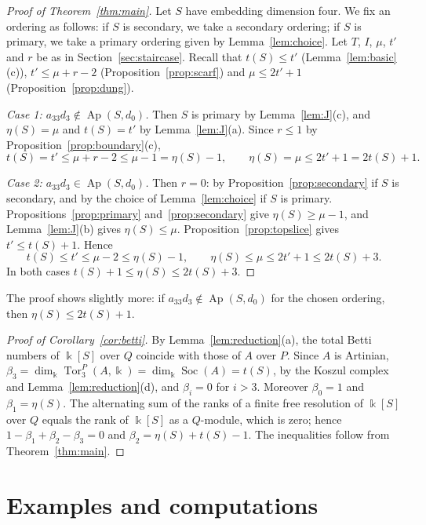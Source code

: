 \documentclass{amsart}
\theoremstyle{definition}
\theoremstyle{remark}
\numberwithin{equation}{section}
\newcommand{\kk}{\Bbbk}
\newcommand{\Ap}{\operatorname{Ap}}
\DeclareMathOperator{\Soc}{Soc}
\DeclareMathOperator{\Tor}{Tor}
\newcommand{\Apd}{\Ap(S,d_0)}
\begin{document}
\begin{proof}[Proof of Theorem~\textup{\ref{thm:main}}]
Let $S$ have embedding dimension four. We fix an ordering as follows: if $S$ is secondary, we take a secondary ordering; if $S$ is primary, we take a primary ordering given by Lemma~\ref{lem:choice}. Let $T$, $I$, $\mu$, $t'$ and $r$ be as in Section~\ref{sec:staircase}. Recall that $t(S)\le t'$ (Lemma~\ref{lem:basic}(c)), $t'\le\mu+r-2$ (Proposition~\ref{prop:scarf}) and $\mu\le2t'+1$ (Proposition~\ref{prop:dung}).

\emph{Case 1: $a_{33}d_3\notin\Apd$.} Then $S$ is primary by Lemma~\ref{lem:J}(c), and $\eta(S)=\mu$ and $t(S)=t'$ by Lemma~\ref{lem:J}(a). Since $r\le1$ by Proposition~\ref{prop:boundary}(c),
\[
t(S)=t'\le\mu+r-2\le\mu-1=\eta(S)-1,\qquad \eta(S)=\mu\le 2t'+1=2t(S)+1 .
\]

\emph{Case 2: $a_{33}d_3\in\Apd$.} Then $r=0$: by Proposition~\ref{prop:secondary} if $S$ is secondary, and by the choice of Lemma~\ref{lem:choice} if $S$ is primary. Propositions~\ref{prop:primary} and~\ref{prop:secondary} give $\eta(S)\ge\mu-1$, and Lemma~\ref{lem:J}(b) gives $\eta(S)\le\mu$. Proposition~\ref{prop:topslice} gives $t'\le t(S)+1$. Hence
\[
t(S)\le t'\le\mu-2\le\eta(S)-1,\qquad \eta(S)\le\mu\le2t'+1\le2t(S)+3 .
\]
In both cases $t(S)+1\le\eta(S)\le2t(S)+3$.
\end{proof}

The proof shows slightly more: if $a_{33}d_3\notin\Apd$ for the chosen ordering, then $\eta(S)\le2t(S)+1$.

\begin{proof}[Proof of Corollary~\textup{\ref{cor:betti}}]
By Lemma~\ref{lem:reduction}(a), the total Betti numbers of $\kk[S]$ over $Q$ coincide with those of $A$ over $P$. Since $A$ is Artinian, $\beta_3=\dim_\kk\Tor^P_3(A,\kk)=\dim_\kk\Soc(A)=t(S)$, by the Koszul complex and Lemma~\ref{lem:reduction}(d), and $\beta_i=0$ for $i>3$. Moreover $\beta_0=1$ and $\beta_1=\eta(S)$. The alternating sum of the ranks of a finite free resolution of $\kk[S]$ over $Q$ equals the rank of $\kk[S]$ as a $Q$-module, which is zero; hence $1-\beta_1+\beta_2-\beta_3=0$ and $\beta_2=\eta(S)+t(S)-1$. The inequalities follow from Theorem~\ref{thm:main}.
\end{proof}

\section{Examples and computations}\label{sec:examples}
\end{document}
